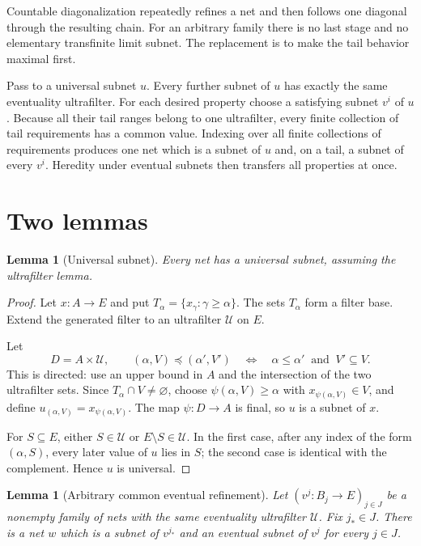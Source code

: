 \documentclass[11pt]{article}
\newtheorem{lemma}[theorem]{Lemma}
\theoremstyle{definition}
\newcommand{\cU}{\mathcal U}
\begin{document}
Countable diagonalization repeatedly refines a net and then follows one
diagonal through the resulting chain.  For an arbitrary family there is no
last stage and no elementary transfinite limit subnet.  The replacement is to
make the tail behavior maximal first.

Pass to a universal subnet $u$.  Every further subnet of $u$ has exactly the
same eventuality ultrafilter.  For each desired property choose a satisfying
subnet $v^i$ of $u$.  Because all their tail ranges belong to one ultrafilter,
every finite collection of tail requirements has a common value.  Indexing
over all finite collections of requirements produces one net which is a
subnet of $u$ and, on a tail, a subnet of every $v^i$.  Heredity under
eventual subnets then transfers all properties at once.

\section{Two lemmas}

\begin{lemma}[Universal subnet]
Every net has a universal subnet, assuming the ultrafilter lemma.
\end{lemma}

\begin{proof}
Let $x\colon A\to E$ and put
$T_\alpha=\{x_\gamma:\gamma\geq\alpha\}$.  The sets $T_\alpha$ form a
filter base.  Extend the generated filter to an ultrafilter $\cU$ on $E$.

Let
\[
 D=A\times\cU,
 \qquad
 (\alpha,V)\preceq(\alpha',V')
 \quad\Longleftrightarrow\quad
 \alpha\leq\alpha'\ \text{ and }\ V'\subseteq V.
\]
This is directed: use an upper bound in $A$ and the intersection of the two
ultrafilter sets.  Since $T_\alpha\cap V\neq\varnothing$, choose
$\psi(\alpha,V)\geq\alpha$ with $x_{\psi(\alpha,V)}\in V$, and define
$u_{(\alpha,V)}=x_{\psi(\alpha,V)}$.  The map $\psi\colon D\to A$ is final,
so $u$ is a subnet of $x$.

For $S\subseteq E$, either $S\in\cU$ or $E\setminus S\in\cU$.  In the first
case, after any index of the form $(\alpha,S)$, every later value of $u$ lies
in $S$; the second case is identical with the complement.  Hence $u$ is
universal.
\end{proof}

\begin{lemma}[Arbitrary common eventual refinement]
Let $(v^j\colon B_j\to E)_{j\in J}$ be a nonempty family of nets with the same
eventuality ultrafilter $\cU$.  Fix $j_*\in J$.  There is a net $w$ which is a
subnet of $v^{j_*}$ and an eventual subnet of $v^j$ for every $j\in J$.
\end{lemma}
\end{document}

